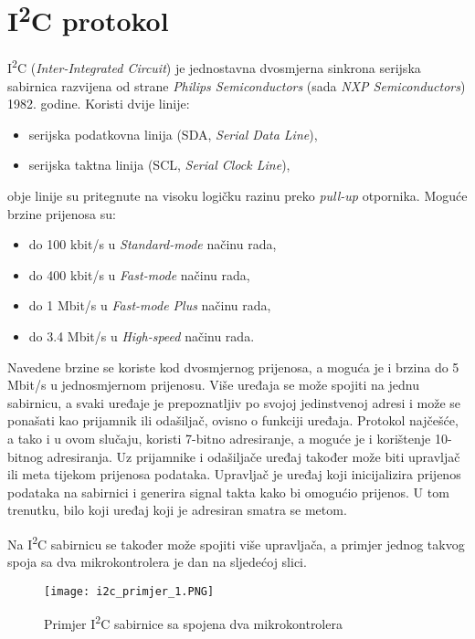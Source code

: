 \documentclass[times, utf8, zavrsni]{fer}
\begin{document}
\section{I\textsuperscript{2}C protokol}
I\textsuperscript{2}C (\textit{Inter-Integrated Circuit}) je jednostavna dvosmjerna sinkrona serijska sabirnica razvijena od strane \textit{Philips Semiconductors} (sada \textit{NXP Semiconductors}) 1982. godine. Koristi dvije linije:
\begin{itemize}
\item serijska podatkovna linija (SDA, \textit{Serial Data Line}),
\item serijska taktna linija (SCL, \textit{Serial Clock Line}),
\end{itemize}
obje linije su pritegnute na visoku logičku razinu preko \textit{pull-up} otpornika. Moguće brzine prijenosa su:
\begin{itemize}
\item do 100 \si{kbit/s} u \textit{Standard-mode} načinu rada, 
\item do 400 \si{kbit/s} u \textit{Fast-mode} načinu rada,
\item do 1 \si{Mbit/s} u \textit{Fast-mode Plus} načinu rada,
\item do 3.4 \si{Mbit/s} u \textit{High-speed} načinu rada.
\end{itemize}
Navedene brzine se koriste kod dvosmjernog prijenosa, a moguća je i brzina do 5 \si{Mbit/s} u jednosmjernom prijenosu. Više uređaja se može spojiti na jednu sabirnicu, a svaki uređaje je prepoznatljiv po svojoj jedinstvenoj adresi i može se ponašati kao prijamnik ili odašiljač, ovisno o funkciji uređaja. Protokol najčešće, a tako i u ovom slučaju, koristi 7-bitno adresiranje, a moguće je i korištenje 10-bitnog adresiranja. Uz prijamnike i odašiljače uređaj također može biti upravljač ili meta tijekom prijenosa podataka. Upravljač je uređaj koji inicijalizira prijenos podataka na sabirnici i generira signal takta kako bi omogućio prijenos. U tom trenutku, bilo koji uređaj koji je adresiran smatra se metom.

Na I\textsuperscript{2}C sabirnicu se također može spojiti više upravljača, a primjer jednog takvog spoja sa dva mikrokontrolera je dan na sljedećoj slici.

\begin{figure}[htp]
\centering
\texttt{[image: i2c\_primjer\_1.PNG]}
\caption{Primjer I\textsuperscript{2}C sabirnice sa spojena dva mikrokontrolera}
\label{fig:i2c_primjer_1}
\end{figure}
\end{document}
